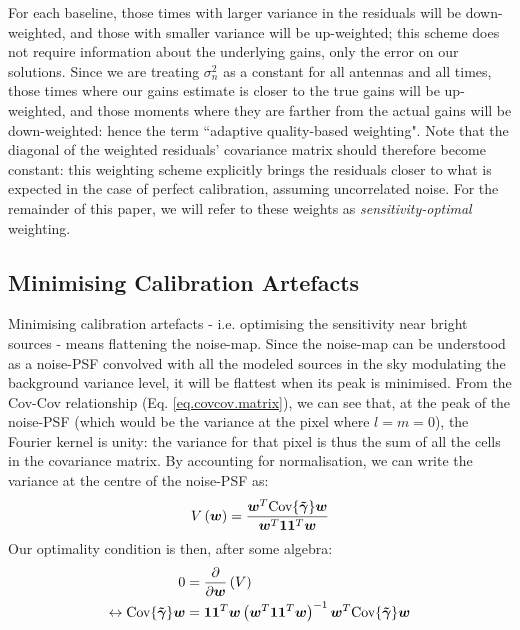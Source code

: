 \pg
For each baseline, those times with larger variance in the residuals will be down-weighted, and those with smaller variance will be up-weighted; this scheme does not require information about the underlying gains, only the error on our solutions. Since we are treating $\sigma_n^2$ as a constant for all antennas and all times, those times where our gains estimate is closer to the true gains will be up-weighted, and those moments where they are farther from the actual gains will be down-weighted: hence the term ``adaptive quality-based weighting". Note that the diagonal of the weighted residuals' covariance matrix should therefore become constant: this weighting scheme explicitly brings the residuals closer to what is expected in the case of perfect calibration, assuming uncorrelated noise. For the remainder of this paper, we will refer to these weights as \emph{sensitivity-optimal} weighting.



\subsection{Minimising Calibration Artefacts}\label{sec.fullweights.formalism}

\pg
Minimising calibration artefacts - i.e. optimising the sensitivity near bright sources - means flattening the noise-map. Since the noise-map can be understood as a noise-PSF convolved with all the modeled sources in the sky {modulating the background variance level,} it will be flattest when its peak is minimised. From the Cov-Cov relationship (Eq. \ref{eq.covcov.matrix}), we can see that, at the peak of the noise-PSF (which would be the variance at the pixel where $l=m=0$), the Fourier kernel is unity: the variance for that pixel is thus the sum of all the cells in the covariance matrix. By accounting for normalisation, we can write the variance at the centre of the noise-PSF as:
\begin{align}
V\left(\bm{w}\right) = \frac{\bm{w}^T {\textrm{Cov}\{\bm{\tilde{\gamma}}\}}\bm{w} }{\bm{w}^T \mathbf{1} \mathbf{1}^T \bm{w}}
\end{align}
Our optimality condition is then, after some algebra:
\begin{alignat}{2}
0 &=\frac{\partial}{\partial \bm{w}}\left( V \right)\\
\leftrightarrow
\textrm{Cov}\{\bm{\tilde{\gamma}}\} \bm{w} &= \mathbf{1}\mathbf{1}^T \bm{w} \left(\bm{w}^T \bm{1}\bm{1}^T\bm{w}\right)^{-1} \bm{w}^T\textrm{Cov}\{\bm{\tilde{\gamma}}\} \bm{w}
\end{alignat}


